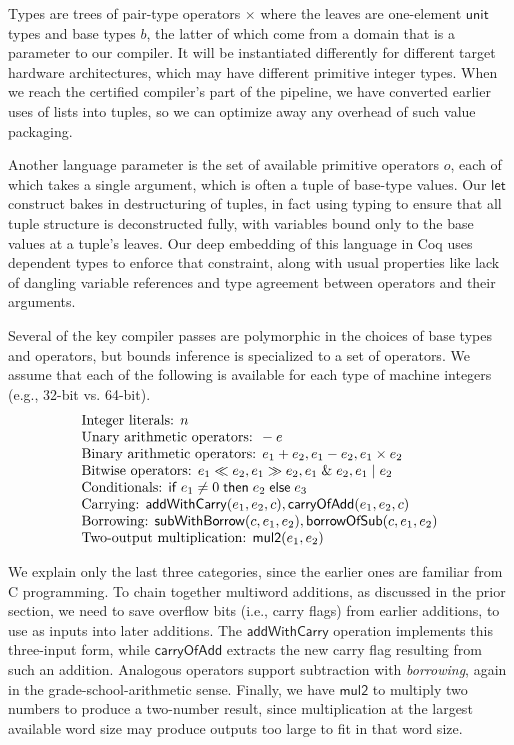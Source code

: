 \documentclass[conference,letterpaper]{IEEEtran}
\newcommand{\kw}[1]{\mathsf{#1}}
\begin{document}
Types are trees of pair-type operators $\times$ where the leaves are one-element $\kw{unit}$ types and base types $b$, the latter of which come from a domain that is a parameter to our compiler.
It will be instantiated differently for different target hardware architectures, which may have different primitive integer types.
When we reach the certified compiler's part of the pipeline, we have converted earlier uses of lists into tuples, so we can optimize away any overhead of such value packaging.

Another language parameter is the set of available primitive operators $o$, each of which takes a single argument, which is often a tuple of base-type values.
Our $\kw{let}$ construct bakes in destructuring of tuples, in fact using typing to ensure that all tuple structure is deconstructed fully, with variables bound only to the base values at a tuple's leaves.
Our deep embedding of this language in Coq uses dependent types to enforce that constraint, along with usual properties like lack of dangling variable references and type agreement between operators and their arguments.

Several of the key compiler passes are polymorphic in the choices of base types and operators, but bounds inference is specialized to a set of operators.
We assume that each of the following is available for each type of machine integers (e.g., 32-bit vs. 64-bit).
$$\begin{array}{@{}l@{}}
  \textrm{Integer literals: } n \\
  \textrm{Unary arithmetic operators: } -e \\
  \textrm{Binary arithmetic operators: } e_1 + e_2, e_1 - e_2, e_1 \times e_2 \\
  \textrm{Bitwise operators: } e_1 \ll e_2, e_1 \gg e_2, e_1 \; \& \; e_2, e_1 \mid e_2 \\
  \textrm{Conditionals: } \mathsf{if} \; e_1 \neq 0 \; \mathsf{then} \; e_2 \; \mathsf{else} \; e_3 \\
  \textrm{Carrying: } \mathsf{addWithCarry}(e_1, e_2, c), \mathsf{carryOfAdd}(e_1, e_2, c) \\
  \textrm{Borrowing: } \mathsf{subWithBorrow}(c, e_1, e_2), \mathsf{borrowOfSub}(c, e_1, e_2) \\
  \textrm{Two-output multiplication: } \mathsf{mul2}(e_1, e_2)
\end{array}$$

We explain only the last three categories, since the earlier ones are familiar from C programming.
To chain together multiword additions, as discussed in the prior section, we need to save overflow bits (i.e., carry flags) from earlier additions, to use as inputs into later additions.
The $\mathsf{addWithCarry}$ operation implements this three-input form, while $\mathsf{carryOfAdd}$ extracts the new carry flag resulting from such an addition.
Analogous operators support subtraction with \emph{borrowing}, again in the grade-school-arithmetic sense.
Finally, we have $\mathsf{mul2}$ to multiply two numbers to produce a two-number result, since multiplication at the largest available word size may produce outputs too large to fit in that word size.
\end{document}
